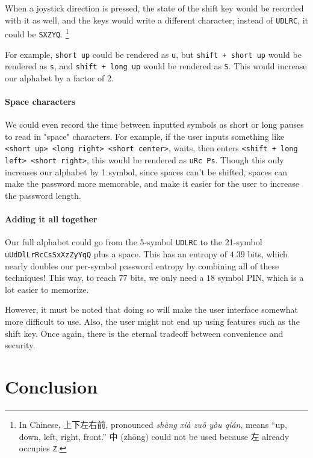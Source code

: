 \documentclass{article}
\begin{document}
\begin{CJK*}{UTF8}{gbsn}
When a joystick direction is pressed, the state of the shift key would be recorded with it as well, and the keys would write a different character; instead of \texttt{UDLRC}, it could be \texttt{SXZYQ}. \footnote{In Chinese, 上下左右前, pronounced \textit{shàng xià zuǒ yòu qián}, means ``up, down, left, right, front.'' 中 (zhōng) could not be used because 左 already occupies \texttt{Z}.}
\end{CJK*}

For example, \texttt{short up} could be rendered as \texttt{u}, but \texttt{shift + short up} would be rendered as \texttt{s}, and \texttt{shift + long up} would be rendered as \texttt{S}. This would increase our alphabet by a factor of 2.

\paragraph{Space characters} We could even record the time between inputted symbols as short or long pauses to read in "space" characters. For example, if the user inputs something like \texttt{<short up> <long right> <short center>}, waits, then enters \texttt{<shift + long left> <short right>}, this would be rendered as \texttt{uRc Ps}. Though this only increases our alphabet by 1 symbol, since spaces can't be shifted, spaces can make the password more memorable, and make it easier for the user to increase the password length.

\paragraph{Adding it all together} Our full alphabet could go from the 5-symbol \texttt{UDLRC} to the 21-symbol \texttt{uUdDlLrRcCsSxXzZyYqQ} plus a space. This has an entropy of $4.39$ bits, which nearly doubles our per-symbol password entropy by combining all of these techniques! This way, to reach $77$ bits, we only need a $18$ symbol PIN, which is a lot easier to memorize.

However, it must be noted that doing so will make the user interface somewhat more difficult to use. Also, the user might not end up using features such as the shift key. Once again, there is the eternal tradeoff between convenience and security.

\section{Conclusion}
\end{document}
